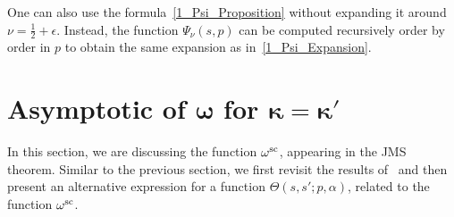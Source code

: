 \documentclass[pdftex]{sigma}
\numberwithin{equation}{section}
\begin{document}
One can also use the formula~\eqref{1_Psi_Proposition} without expanding it around $\nu=\frac{1}{2}+\epsilon$. Instead, the function $\Psi_\nu(s, p)$ can be computed recursively order by order in $p$ to obtain the same expansion as in~\eqref{1_Psi_Expansion}.


\section[Asymptotic of omega for kappa=kappa']{Asymptotic of $\boldsymbol{\omega}$ for $\boldsymbol{\kappa=\kappa'}$} \label{section:Omega}
In this section, we are discussing the function $\omega^{{\rm sc}}$, appearing in the JMS theorem. Similar to the previous section, we first revisit the results of~\cite{Boos_TBAE, HGS_4, HGS_1, HGS_2, HGS_3} and then present an alternative expression for a function $\Theta(s, s'; p, \alpha)$, related to the function $\omega^{{\rm sc}}$.
\end{document}
